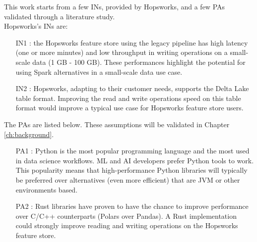 This work starts from a few \glspl{IN}, provided by Hopsworks, and a few \glspl{PA} validated through a literature study. \\ Hopsworks's \glspl{IN} are:
\begin{itemize}
    \item[IN1 :] the Hopsworks feature store using the legacy pipeline has high latency (one or more minutes) and low throughput in writing operations on a small-scale data (1 GB - 100 GB). These performances highlight the potential for using Spark alternatives in a small-scale data use case.
    \item[IN2 :] Hopsworks, adapting to their customer needs, supports the Delta Lake table format. Improving the read and write operations speed on this table format would improve a typical use case for Hopsworks feature store users.
\end{itemize}
The \glspl{PA} are listed below. These assumptions will be validated in Chapter \ref{ch:background}. 
\begin{itemize}
    \item[PA1 :] Python is the most popular programming language and the most used in data science workflows. \gls{ML} and \gls{AI} developers prefer Python tools to work. This popularity means that high-performance Python libraries will typically be preferred over alternatives (even more efficient) that are \gls{JVM} or other environments based.
    \item[PA2 :] Rust libraries have proven to have the chance to improve performance over C/C++ counterparts (Polars over Pandas). A Rust implementation could strongly improve reading and writing operations on the Hopsworks feature store.
\end{itemize}

